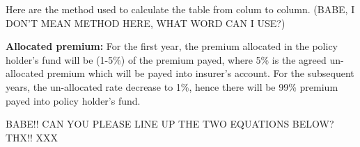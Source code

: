 \documentclass{report}
\begin{document}





Here are the method used to calculate the table from colum to column.  (BABE, I DON'T MEAN METHOD HERE, WHAT WORD CAN I USE?)

\textbf{Allocated premium:} For the first year, the premium allocated in the policy holder's fund will be (1-5\%) of the premium payed, where 5\% is the agreed un-allocated premium which will be payed into insurer's account. For the subsequent years, the un-allocated rate decrease to 1\%, hence there will be 99\% premium payed into policy holder's fund.

BABE!! CAN YOU PLEASE LINE UP THE TWO EQUATIONS BELOW? THX!! XXX
\end{document}
